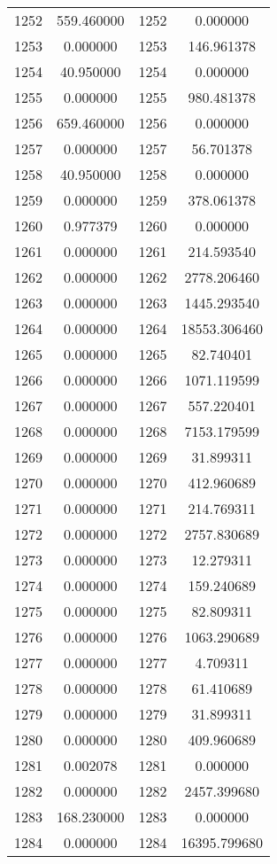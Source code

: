 \documentclass[12pt]{article}
\begin{document}
\begin{longtable}{@{}cccc@{}}
1252 & 559.460000 & 1252 & 0.000000 \\
1253 & 0.000000 & 1253 & 146.961378 \\
1254 & 40.950000 & 1254 & 0.000000 \\
1255 & 0.000000 & 1255 & 980.481378 \\
1256 & 659.460000 & 1256 & 0.000000 \\
1257 & 0.000000 & 1257 & 56.701378 \\
1258 & 40.950000 & 1258 & 0.000000 \\
1259 & 0.000000 & 1259 & 378.061378 \\
1260 & 0.977379 & 1260 & 0.000000 \\
1261 & 0.000000 & 1261 & 214.593540 \\
1262 & 0.000000 & 1262 & 2778.206460 \\
1263 & 0.000000 & 1263 & 1445.293540 \\
1264 & 0.000000 & 1264 & 18553.306460 \\
1265 & 0.000000 & 1265 & 82.740401 \\
1266 & 0.000000 & 1266 & 1071.119599 \\
1267 & 0.000000 & 1267 & 557.220401 \\
1268 & 0.000000 & 1268 & 7153.179599 \\
1269 & 0.000000 & 1269 & 31.899311 \\
1270 & 0.000000 & 1270 & 412.960689 \\
1271 & 0.000000 & 1271 & 214.769311 \\
1272 & 0.000000 & 1272 & 2757.830689 \\
1273 & 0.000000 & 1273 & 12.279311 \\
1274 & 0.000000 & 1274 & 159.240689 \\
1275 & 0.000000 & 1275 & 82.809311 \\
1276 & 0.000000 & 1276 & 1063.290689 \\
1277 & 0.000000 & 1277 & 4.709311 \\
1278 & 0.000000 & 1278 & 61.410689 \\
1279 & 0.000000 & 1279 & 31.899311 \\
1280 & 0.000000 & 1280 & 409.960689 \\
1281 & 0.002078 & 1281 & 0.000000 \\
1282 & 0.000000 & 1282 & 2457.399680 \\
1283 & 168.230000 & 1283 & 0.000000 \\
1284 & 0.000000 & 1284 & 16395.799680 \\

\end{longtable}
\end{document}
